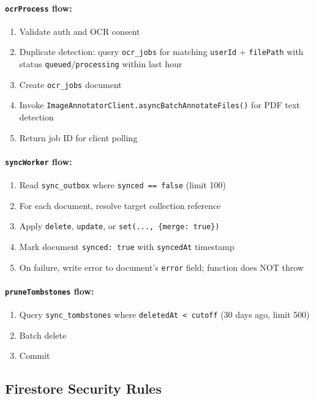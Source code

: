 \documentclass[12pt,a4paper,openany]{report}
\begin{document}
\paragraph{\texttt{ocrProcess} flow:}
\begin{enumerate}[leftmargin=*]
  \item Validate auth and OCR consent
  \item Duplicate detection: query \texttt{ocr\_jobs} for matching \texttt{userId} + \texttt{filePath} with status \texttt{queued}/\texttt{processing} within last hour
  \item Create \texttt{ocr\_jobs} document
  \item Invoke \texttt{ImageAnnotatorClient.asyncBatchAnnotateFiles()} for PDF text detection
  \item Return job ID for client polling
\end{enumerate}

\paragraph{\texttt{syncWorker} flow:}
\begin{enumerate}[leftmargin=*]
  \item Read \texttt{sync\_outbox} where \texttt{synced == false} (limit 100)
  \item For each document, resolve target collection reference
  \item Apply \texttt{delete}, \texttt{update}, or \texttt{set(..., \{merge: true\})}
  \item Mark document \texttt{synced: true} with \texttt{syncedAt} timestamp
  \item On failure, write error to document's \texttt{error} field; function does NOT throw
\end{enumerate}

\paragraph{\texttt{pruneTombstones} flow:}
\begin{enumerate}[leftmargin=*]
  \item Query \texttt{sync\_tombstones} where \texttt{deletedAt < cutoff} (30 days ago, limit 500)
  \item Batch delete
  \item Commit
\end{enumerate}

\subsection{Firestore Security Rules}
\end{document}
